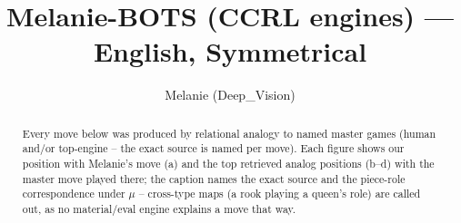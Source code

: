 \documentclass[11pt]{article}
\title{Melanie-BOTS (CCRL engines) — English, Symmetrical}
\author{Melanie (Deep\_Vision)}
\date{}
\begin{document}
\maketitle

\begin{abstract}Every move below was produced by relational analogy to named master games (human and/or top-engine -- the exact source is named per move). Each figure shows our position with Melanie's move (a) and the top retrieved analog positions (b--d) with the master move played there; the caption names the exact source and the piece-role correspondence under $\mu$ -- cross-type maps (a rook playing a queen's role) are called out, as no material/eval engine explains a move that way.\end{abstract}

\begin{figure}[p]\centering
\begin{subfigure}{0.46\textwidth}\centering
\resizebox{\linewidth}{!}{%
\newchessgame
\chessboard[
  setfen={r1bq1rk1/pp1pppbp/2n2np1/2p5/2P4N/2N3P1/PP1PPPBP/R1BQ1RK1 b - - 5 7},
  showmover=false,
  pgfstyle=straightmove, color=movearrow, markmove={c6-d4}
]}
\caption{}
\end{subfigure}\hfill
\begin{subfigure}{0.46\textwidth}\centering
\resizebox{\linewidth}{!}{%
\newchessgame
\chessboard[
  setfen={r1bq1rk1/pp1pppbp/2n2np1/8/2PN4/2N3P1/PP2PPBP/R1BQ1RK1 b - - 2 8},
  showmover=false,
  pgfstyle=straightmove, color=movearrow, markmove={c6-d4}
]}
\caption{}
\end{subfigure}
\\[4pt]
\begin{subfigure}{0.46\textwidth}\centering
\resizebox{\linewidth}{!}{%
\newchessgame
\chessboard[
  setfen={r1bq1rk1/pp1pppbp/2n2np1/8/2PN4/2N3P1/PP2PPBP/R1BQ1RK1 b - - 2 8},
  showmover=false,
  pgfstyle=straightmove, color=movearrow, markmove={c6-d4}
]}
\caption{}
\end{subfigure}\hfill
\begin{subfigure}{0.46\textwidth}\centering
\resizebox{\linewidth}{!}{%
\newchessgame
\chessboard[
  setfen={r1bq1rk1/pp1pppbp/2n2np1/8/2PN4/2N3P1/PP2PPBP/R1BQ1RK1 b - - 2 8},
  showmover=false,
  pgfstyle=straightmove, color=movearrow, markmove={c6-d4}
]}
\caption{}
\end{subfigure}

\end{figure}
\end{document}
